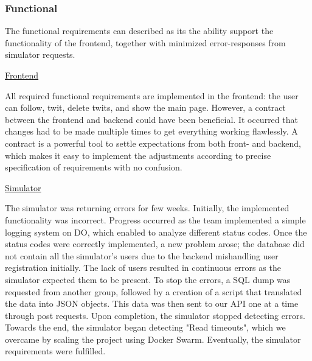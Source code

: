 \subsubsection*{Functional}

The functional requirements can described as its  the ability support the functionality of the frontend, together with minimized error-responses from simulator requests.
\vspace{3mm}

\underline{Frontend}

All required functional requirements are implemented in the frontend: the user can follow, twit, delete twits, and show the main page. However, a contract between the frontend and backend could have been beneficial. It occurred that changes had to be made multiple times to get everything working flawlessly. A contract is a powerful tool to settle expectations from both front- and backend, which makes it easy to implement the adjustments according to precise specification of requirements with no confusion.
\vspace{3mm}

\underline{Simulator}

The simulator was returning errors for few weeks. Initially, the implemented functionality was incorrect. Progress occurred as the team implemented a simple logging system on DO, which enabled to analyze different status codes. Once the status codes were correctly implemented, a new problem arose; the database did not contain all the simulator's users due to the backend mishandling user registration initially. The lack of users resulted in continuous errors as the simulator expected them to be present. To stop the errors, a SQL dump was requested from another group, followed by a creation of a script that translated the data into JSON objects. This data was then sent to our API one at a time through post requests. Upon completion, the simulator stopped detecting errors. Towards the end, the simulator began detecting "Read timeouts", which we overcame by scaling the project using Docker Swarm. Eventually, the simulator requirements were fulfilled.